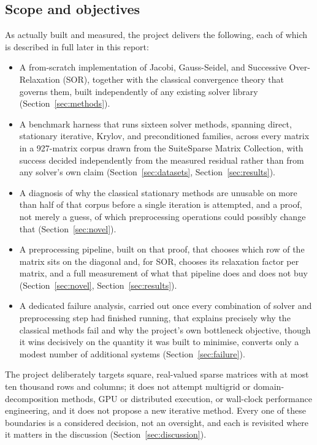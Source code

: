 \documentclass[11pt,a4paper]{article}
\begin{document}
\subsection{Scope and objectives}
\label{sec:intro-scope}

As actually built and measured, the project delivers the following, each of which is
described in full later in this report:

\begin{itemize}[leftmargin=1.4cm]
  \item A from-scratch implementation of Jacobi, Gauss-Seidel, and Successive
  Over-Relaxation (SOR), together with the classical convergence theory that governs them,
  built independently of any existing solver library (Section~\ref{sec:methods}).
  \item A benchmark harness that runs sixteen solver methods, spanning direct, stationary
  iterative, Krylov, and preconditioned families, across every matrix in a
  927-matrix corpus drawn from the SuiteSparse Matrix Collection, with success decided
  independently from the measured residual rather than from any solver's own claim
  (Section~\ref{sec:datasets}, Section~\ref{sec:results}).
  \item A diagnosis of why the classical stationary methods are unusable on more than half
  of that corpus before a single iteration is attempted, and a proof, not merely a guess,
  of which preprocessing operations could possibly change that (Section~\ref{sec:novel}).
  \item A preprocessing pipeline, built on that proof, that chooses which row of the
  matrix sits on the diagonal and, for SOR, chooses its relaxation factor per matrix, and
  a full measurement of what that pipeline does and does not buy
  (Section~\ref{sec:novel}, Section~\ref{sec:results}).
  \item A dedicated failure analysis, carried out once every combination of solver and
  preprocessing step had finished running, that explains precisely why the classical methods fail and why the
  project's own bottleneck objective, though it wins decisively on the quantity it was
  built to minimise, converts only a modest number of additional systems
  (Section~\ref{sec:failure}).
\end{itemize}

The project deliberately targets square, real-valued sparse matrices with at most ten
thousand rows and columns; it does not attempt multigrid or domain-decomposition methods,
GPU or distributed execution, or wall-clock performance engineering, and it does not
propose a new iterative method. Every one of these boundaries is a considered decision,
not an oversight, and each is revisited where it matters in the discussion
(Section~\ref{sec:discussion}).
\end{document}
